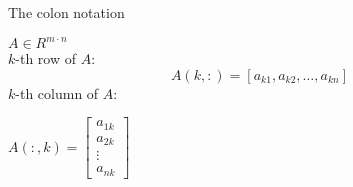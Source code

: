 \begin{frame}{The colon notation}

$ A\in R^{m\cdot n} $ \\
\vspace{10px}
$k$-th row of $A$: %
$$A(k, :) = [a_{k1}, a_{k2}, \dots , a_{kn}]$$ %
$k$-th column of $A$:
\vspace{10px}

\begin{center}
$A(:, k) = \left [ \begin{array}{l}
   a_{1k} \\
   a_{2k}\\
   \vdots\\
   a_{nk}
\end{array}
\right ] $
\end{center}

\end{frame}
